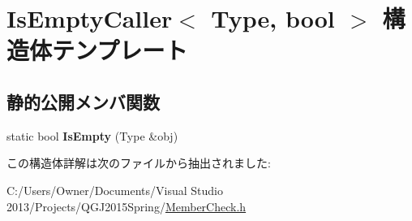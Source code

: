 \hypertarget{struct_is_empty_caller}{}\section{Is\+Empty\+Caller$<$ Type, bool $>$ 構造体テンプレート}
\label{struct_is_empty_caller}
\subsection*{静的公開メンバ関数}
\begin{DoxyCompactItemize}
\item 
static bool {\bfseries Is\+Empty} (Type \&obj)\hypertarget{struct_is_empty_caller_a9645f81d7ed731c9a2d7f32e80dada9d}{}\label{struct_is_empty_caller_a9645f81d7ed731c9a2d7f32e80dada9d}

\end{DoxyCompactItemize}


この構造体詳解は次のファイルから抽出されました\+:\begin{DoxyCompactItemize}
\item 
C\+:/\+Users/\+Owner/\+Documents/\+Visual Studio 2013/\+Projects/\+Q\+G\+J2015\+Spring/\hyperlink{_member_check_8h}{Member\+Check.\+h}\end{DoxyCompactItemize}
